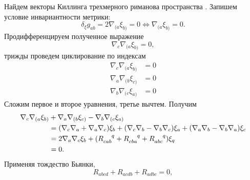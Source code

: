 \documentclass[12pt,a4paper]{article}
\begin{document}
            Найдем векторы Киллинга трехмерного риманова пространства \cite{symmetry_and_killing_fields}. Запишем условие инвариантности метрики:
            \begin{equation}
                \delta_\xi g_{ab}
                    = 2 \nabla_{(a} \xi_{b)}
                    = 0
                    \Leftrightarrow \nabla_{(a} \xi_{b)} = 0.
            \end{equation}
            Продифференцируем полученное выражение
            \begin{equation}
                \nabla_c \nabla_{(a} \xi_{b)} = 0,
            \end{equation}
            трижды проведем циклирование по индексам
            \begin{equation}\begin{aligned}
                \nabla_c \nabla_{(a} \xi_{b)} &= 0 \\
                \nabla_a \nabla_{(b} \xi_{c)} &= 0 \\
                \nabla_b \nabla_{(c} \xi_{a)} &= 0
            \end{aligned}\end{equation}
            Сложим первое и второе уравнения, третье вычтем. Получим
            \begin{equation}\begin{aligned}
                \nabla_c \nabla_{(a} \xi_{b)} &+
                \nabla_a \nabla_{(b} \xi_{c)} -
                \nabla_b \nabla_{(c} \xi_{a)} \\
                    &=  \qty( \nabla_c \nabla_a + \nabla_a \nabla_c ) \xi_b +
                        \qty( \nabla_c \nabla_b - \nabla_b \nabla_c ) \xi_a +
                        \qty( \nabla_a \nabla_b - \nabla_b \nabla_a ) \xi_c \\
                    &= 2 \nabla_a \nabla_c \xi_b + \qty(
                        R_{cab}^{\hphantom{cab}q} +
                        R_{cba}^{\hphantom{cba}q} +
                        R_{abc}^{\hphantom{abc}q}
                    ) \xi_q \\
                    &= 0 .
            \end{aligned}\end{equation}
            Применяя тождество Бьянки,
            \begin{equation}
                R_{abcd} + R_{acdb} + R_{adbc} = 0,
            \end{equation}
\end{document}
